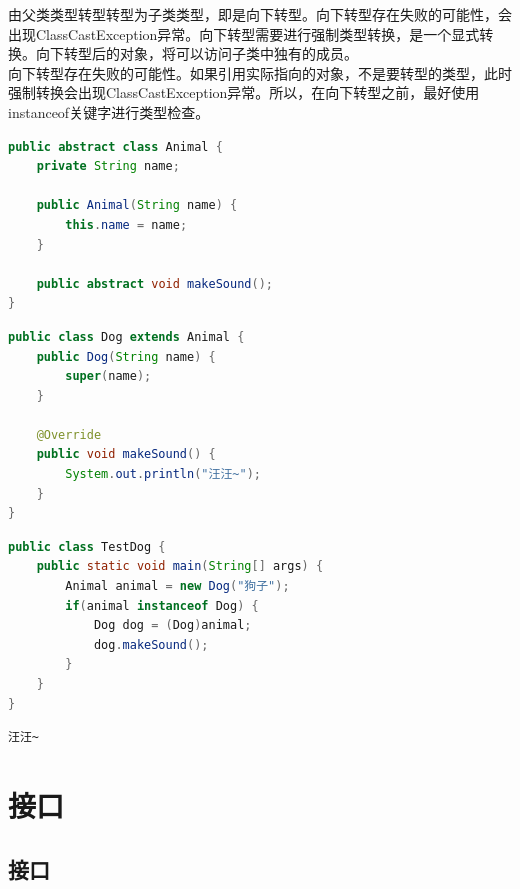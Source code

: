 由父类类型转型转型为子类类型，即是向下转型。向下转型存在失败的可能性，会出现ClassCastException异常。向下转型需要进行强制类型转换，是一个显式转换。向下转型后的对象，将可以访问子类中独有的成员。 \\

向下转型存在失败的可能性。如果引用实际指向的对象，不是要转型的类型，此时强制转换会出现ClassCastException异常。所以，在向下转型之前，最好使用instanceof关键字进行类型检查。 \\


\begin{lstlisting}[language=Java, title=Animal.java]
public abstract class Animal {
    private String name;

    public Animal(String name) {
        this.name = name;
    }

    public abstract void makeSound();
}
\end{lstlisting}

\begin{lstlisting}[language=Java, title=Dog.java]
public class Dog extends Animal {
    public Dog(String name) {
        super(name);
    }
    
    @Override
    public void makeSound() {
        System.out.println("汪汪~");
    }
}
\end{lstlisting}

\begin{lstlisting}[language=Java, title=TestDog.java]
public class TestDog {
    public static void main(String[] args) {
        Animal animal = new Dog("狗子");
        if(animal instanceof Dog) {
            Dog dog = (Dog)animal;
            dog.makeSound();
        }
    }
}
\end{lstlisting}

\begin{tcolorbox}
	\begin{verbatim}
汪汪~
	\end{verbatim}
\end{tcolorbox}

\newpage

\section{接口}

\subsection{接口}

